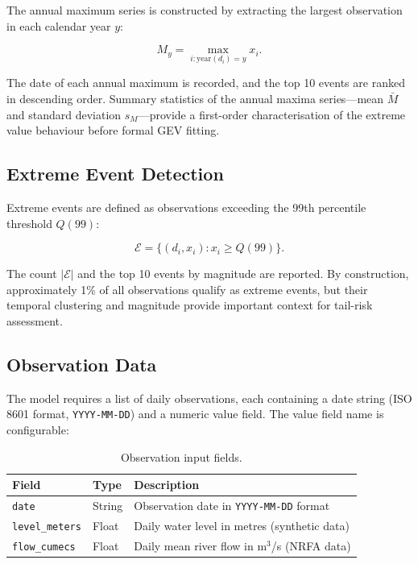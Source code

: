 \documentclass[11pt,a4paper]{article}
\begin{document}
The annual maximum series is constructed by extracting the largest observation in each calendar year $y$:

\[
M_y = \max_{i : \text{year}(d_i) = y} x_i.
\]

\noindent The date of each annual maximum is recorded, and the top 10 events are ranked in descending order. Summary statistics of the annual maxima series---mean $\bar{M}$ and standard deviation $s_M$---provide a first-order characterisation of the extreme value behaviour before formal GEV fitting.

\subsection{Extreme Event Detection}

Extreme events are defined as observations exceeding the 99th percentile threshold $Q(99)$:

\[
\mathcal{E} = \{(d_i, x_i) : x_i \geq Q(99)\}.
\]

\noindent The count $|\mathcal{E}|$ and the top 10 events by magnitude are reported. By construction, approximately 1\% of all observations qualify as extreme events, but their temporal clustering and magnitude provide important context for tail-risk assessment.

\clearpage

\mkminputs

\subsection{Observation Data}

The model requires a list of daily observations, each containing a date string (ISO 8601 format, \texttt{YYYY-MM-DD}) and a numeric value field. The value field name is configurable:

\begin{table}[H]
\centering
\caption{Observation input fields.}
\label{tab:obs_fields}
\begin{tabular}{lll}
\toprule
\textbf{Field} & \textbf{Type} & \textbf{Description} \\
\midrule
\texttt{date}           & String  & Observation date in \texttt{YYYY-MM-DD} format \\
\texttt{level\_meters}  & Float   & Daily water level in metres (synthetic data) \\
\texttt{flow\_cumecs}   & Float   & Daily mean river flow in m$^3$/s (NRFA data) \\
\bottomrule
\end{tabular}
\end{table}
\end{document}
